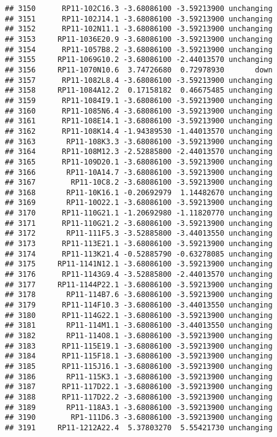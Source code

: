 \documentclass[]{article}
\begin{document}
\begin{verbatim}
## 3150      RP11-102C16.3 -3.68086100 -3.59213900 unchanging
## 3151      RP11-102J14.1 -3.68086100 -3.59213900 unchanging
## 3152      RP11-102N11.1 -3.68086100 -3.59213900 unchanging
## 3153     RP11-1036E20.9 -3.68086100 -3.59213900 unchanging
## 3154      RP11-1057B8.2 -3.68086100 -3.59213900 unchanging
## 3155     RP11-1069G10.2 -3.68086100 -2.44013570 unchanging
## 3156     RP11-1070N10.6  3.74726680  0.72978930       down
## 3157      RP11-1082L8.4 -3.68086100 -3.59213900 unchanging
## 3158     RP11-1084A12.2  0.17158182  0.46675485 unchanging
## 3159      RP11-1084I9.1 -3.68086100 -3.59213900 unchanging
## 3160      RP11-1085N6.4 -3.68086100 -3.59213900 unchanging
## 3161      RP11-108E14.1 -3.68086100 -3.59213900 unchanging
## 3162      RP11-108K14.4 -1.94389530 -1.44013570 unchanging
## 3163       RP11-108K3.3 -3.68086100 -3.59213900 unchanging
## 3164      RP11-108M12.3 -2.52885800 -2.44013570 unchanging
## 3165      RP11-109D20.1 -3.68086100 -3.59213900 unchanging
## 3166       RP11-10A14.7 -3.68086100 -3.59213900 unchanging
## 3167        RP11-10C8.2 -3.68086100 -3.59213900 unchanging
## 3168       RP11-10K16.1 -0.20692979  1.14482670 unchanging
## 3169       RP11-10O22.1 -3.68086100 -3.59213900 unchanging
## 3170      RP11-110G21.1 -1.20692980 -1.11820770 unchanging
## 3171      RP11-110G21.2 -3.68086100 -3.59213900 unchanging
## 3172       RP11-111F5.3 -3.52885800 -3.44013550 unchanging
## 3173      RP11-113E21.1 -3.68086100 -3.59213900 unchanging
## 3174      RP11-113K21.4 -0.52885790 -0.63278085 unchanging
## 3175     RP11-1141N12.1 -3.68086100 -3.59213900 unchanging
## 3176      RP11-1143G9.4 -3.52885800 -2.44013570 unchanging
## 3177     RP11-1144P22.1 -3.68086100 -3.59213900 unchanging
## 3178       RP11-114B7.6 -3.68086100 -3.59213900 unchanging
## 3179      RP11-114F10.3 -3.68086100 -3.44013550 unchanging
## 3180      RP11-114G22.1 -3.68086100 -3.59213900 unchanging
## 3181       RP11-114M1.1 -3.68086100 -3.44013550 unchanging
## 3182       RP11-114O8.1 -3.68086100 -3.59213900 unchanging
## 3183      RP11-115E19.1 -3.68086100 -3.59213900 unchanging
## 3184      RP11-115F18.1 -3.68086100 -3.59213900 unchanging
## 3185      RP11-115J16.1 -3.68086100 -3.59213900 unchanging
## 3186       RP11-115K3.1 -3.68086100 -3.59213900 unchanging
## 3187      RP11-117D22.1 -3.68086100 -3.59213900 unchanging
## 3188      RP11-117D22.2 -3.68086100 -3.59213900 unchanging
## 3189       RP11-118A3.1 -3.68086100 -3.59213900 unchanging
## 3190        RP1-111D6.3 -3.68086100 -3.59213900 unchanging
## 3191     RP11-1212A22.4  5.37803270  5.55421730 unchanging

\end{verbatim}
\end{document}
